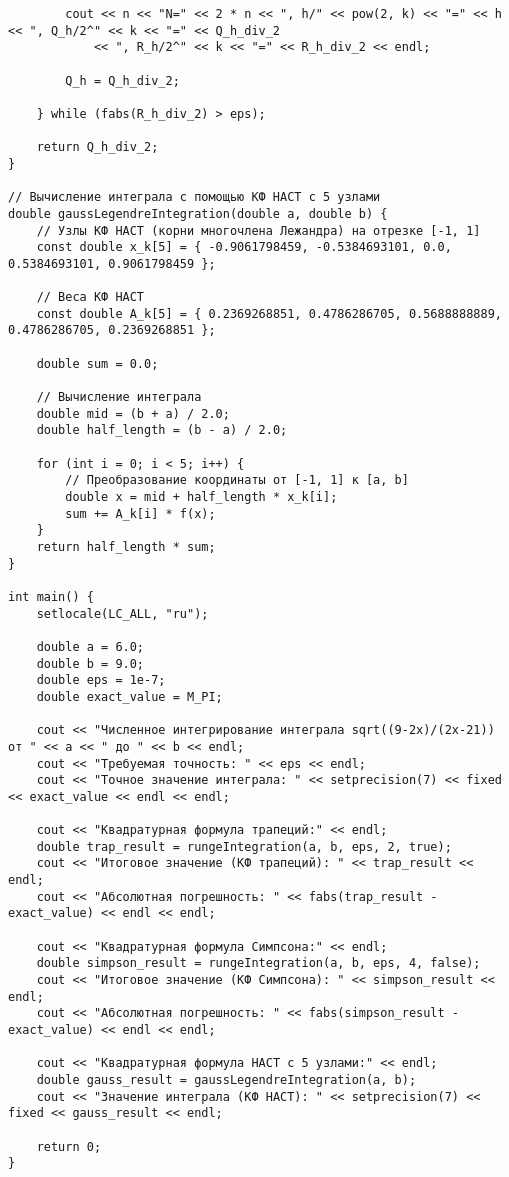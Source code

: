 \documentclass[12pt,a4paper]{article}
\begin{document}
\begin{verbatim}
        cout << n << "N=" << 2 * n << ", h/" << pow(2, k) << "=" << h << ", Q_h/2^" << k << "=" << Q_h_div_2
            << ", R_h/2^" << k << "=" << R_h_div_2 << endl;

        Q_h = Q_h_div_2;

    } while (fabs(R_h_div_2) > eps); 

    return Q_h_div_2;
}

// Вычисление интеграла с помощью КФ НАСТ с 5 узлами
double gaussLegendreIntegration(double a, double b) {
    // Узлы КФ НАСТ (корни многочлена Лежандра) на отрезке [-1, 1]
    const double x_k[5] = { -0.9061798459, -0.5384693101, 0.0, 0.5384693101, 0.9061798459 };

    // Веса КФ НАСТ
    const double A_k[5] = { 0.2369268851, 0.4786286705, 0.5688888889, 0.4786286705, 0.2369268851 };

    double sum = 0.0;

    // Вычисление интеграла
    double mid = (b + a) / 2.0;
    double half_length = (b - a) / 2.0;

    for (int i = 0; i < 5; i++) {
        // Преобразование координаты от [-1, 1] к [a, b]
        double x = mid + half_length * x_k[i];
        sum += A_k[i] * f(x);
    }
    return half_length * sum;
}

int main() {
    setlocale(LC_ALL, "ru");

    double a = 6.0;        
    double b = 9.0;        
    double eps = 1e-7;     
    double exact_value = M_PI;

    cout << "Численное интегрирование интеграла sqrt((9-2x)/(2x-21)) от " << a << " до " << b << endl;
    cout << "Требуемая точность: " << eps << endl;
    cout << "Точное значение интеграла: " << setprecision(7) << fixed << exact_value << endl << endl;

    cout << "Квадратурная формула трапеций:" << endl;
    double trap_result = rungeIntegration(a, b, eps, 2, true);
    cout << "Итоговое значение (КФ трапеций): " << trap_result << endl;
    cout << "Абсолютная погрешность: " << fabs(trap_result - exact_value) << endl << endl;

    cout << "Квадратурная формула Симпсона:" << endl;
    double simpson_result = rungeIntegration(a, b, eps, 4, false);
    cout << "Итоговое значение (КФ Симпсона): " << simpson_result << endl;
    cout << "Абсолютная погрешность: " << fabs(simpson_result - exact_value) << endl << endl;

    cout << "Квадратурная формула НАСТ с 5 узлами:" << endl;
    double gauss_result = gaussLegendreIntegration(a, b);
    cout << "Значение интеграла (КФ НАСТ): " << setprecision(7) << fixed << gauss_result << endl;

    return 0;
}
   \end{verbatim}
\end{document}
